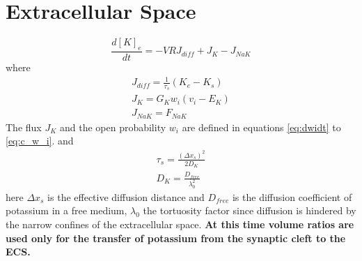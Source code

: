 \documentclass[fleqn]{report}
\numberwithin{equation}{section}
\numberwithin{equation}{section}
\newcommand{\LArg}{\text{L-Arg}}
\newcommand{\Otwo}{\text{O$_2$}}
\begin{document}
	\section{Extracellular Space}
	\begin{equation}
	\frac{d[K]_e}{dt}=-VRJ_{diff}+J_K-J_{NaK}
	\end{equation}
	where
	\begin{eqnarray}
	J_{diff}=\frac{1}{\tau_s}(K_{e}-K_s)\\
	J_K=G_Kw_i(v_i-E_K)\\
	J_{NaK}=F_{NaK}
	\end{eqnarray}
	The flux $J_K$ and the open probability $w_{i}$ are defined in equations \ref{eq:dwidt} to \ref{eq:c_w_i}.
	and 
	\begin{eqnarray}\label{eqn:potassium_diff_time}
	\tau_s=\frac{(\Delta x_s)^2}{2D_K}\\
		 D_K=\frac{D_{free}}{\lambda^{2}_{0}}
	\end{eqnarray}
	here $\Delta x_s$ is the effective diffusion distance and $D_{free}$ is the diffusion coefficient of potassium in a free medium, $\lambda_{0}$ the tortuosity factor since diffusion is hindered by the narrow confines of the extracellular space. \textbf{At this time volume ratios are used only for the transfer of potassium from the synaptic cleft to the ECS. }
		
\end{document}
